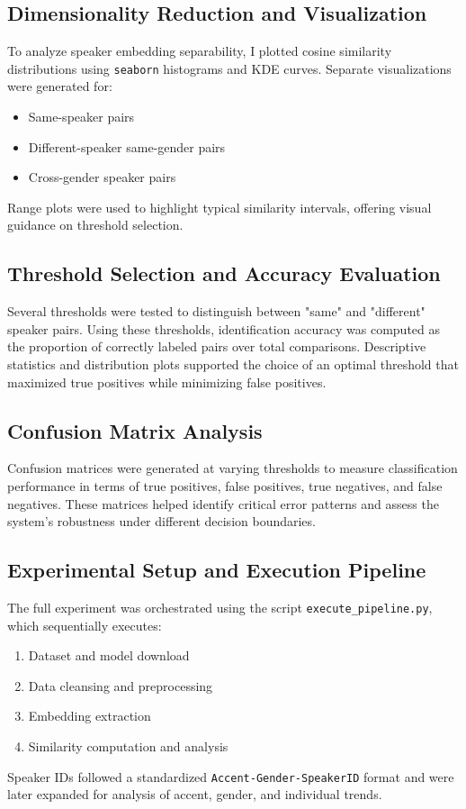 \documentclass[conference]{IEEEtran}
\begin{document}
\subsection*{Dimensionality Reduction and Visualization}
To analyze speaker embedding separability, I plotted cosine similarity distributions using \texttt{seaborn} histograms and KDE curves. Separate visualizations were generated for:
\begin{itemize}
	\item Same-speaker pairs
	\item Different-speaker same-gender pairs
	\item Cross-gender speaker pairs
\end{itemize}
Range plots were used to highlight typical similarity intervals, offering visual guidance on threshold selection.

\subsection*{Threshold Selection and Accuracy Evaluation}
Several thresholds were tested to distinguish between "same" and "different" speaker pairs. Using these thresholds, identification accuracy was computed as the proportion of correctly labeled pairs over total comparisons. Descriptive statistics and distribution plots supported the choice of an optimal threshold that maximized true positives while minimizing false positives.

\subsection*{Confusion Matrix Analysis}
Confusion matrices were generated at varying thresholds to measure classification performance in terms of true positives, false positives, true negatives, and false negatives. These matrices helped identify critical error patterns and assess the system's robustness under different decision boundaries.

\subsection*{Experimental Setup and Execution Pipeline}
The full experiment was orchestrated using the script \texttt{execute\_pipeline.py}, which sequentially executes:
\begin{enumerate}
	\item Dataset and model download
	\item Data cleansing and preprocessing
	\item Embedding extraction
	\item Similarity computation and analysis
\end{enumerate}
Speaker IDs followed a standardized \texttt{Accent-Gender-SpeakerID} format and were later expanded for analysis of accent, gender, and individual trends.
\end{document}

